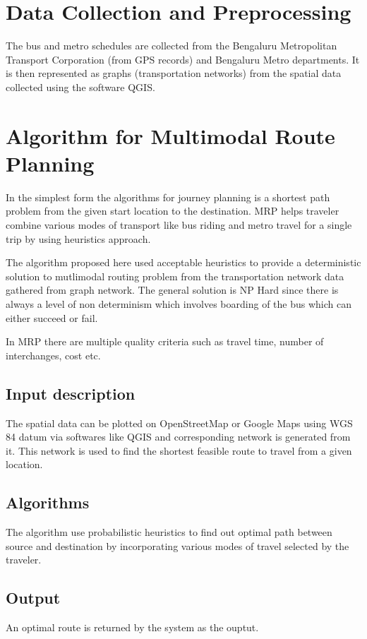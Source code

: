 \documentclass[12pt,a4paper]{article}
\begin{document}
\section{Data Collection and Preprocessing}

The bus and metro schedules are collected from the Bengaluru Metropolitan Transport Corporation (from GPS records) and Bengaluru Metro departments. It is then represented as graphs (transportation networks) from the spatial data collected using the software QGIS. 


\section{Algorithm for Multimodal Route Planning}

In the simplest form the algorithms for journey planning is a shortest path problem from the given start location to the destination. MRP helps traveler combine various modes of transport like bus riding and metro travel for a single trip by using heuristics approach. 

The algorithm proposed here used acceptable heuristics to provide a deterministic solution to mutlimodal routing problem from the transportation network data gathered from  graph network. The general solution is NP Hard since there is always a level of non determinism which involves boarding of the bus which can either succeed or fail.

In MRP there are multiple quality criteria such as travel time, number of interchanges, cost etc.

\subsection{Input description}
The spatial data can be plotted on OpenStreetMap or Google Maps using WGS 84 datum via softwares like QGIS and corresponding network is generated from it. This network is used to find the shortest feasible route to travel from a given location.

\subsection{Algorithms}
The algorithm use probabilistic heuristics to find out optimal path between source and destination by incorporating various modes of travel selected by the traveler.

\subsection{Output}
An optimal route is returned by the system as the ouptut.
\end{document}
